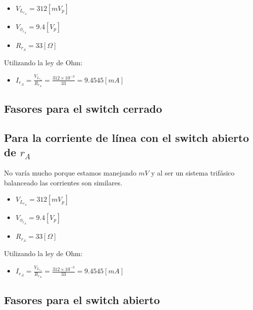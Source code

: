 \documentclass[12pt, letterpaper]{article}
\begin{document}
\begin{itemize}
	\item \(V_{L_{r_A}} = 312 [mV_p]\)
	\item \(V_{\phi_{r_A}} = 9.4 [V_p]\)
	\item \(R_{r_A} = 33 [\Omega]\)
\end{itemize}

Utilizando la ley de Ohm:

\begin{itemize}
	\item \(I_{r_A} = \frac{V_{L_{r_A}}}{R_{r_A}} = \frac{312 \times 10^{-3}}{33} = 9.4545 [mA]\)
\end{itemize}


\subsection*{Fasores para el switch cerrado}


\subsection*{Para la corriente de línea con el switch abierto de \(r_A\)}

No varía mucho porque estamos manejando \(mV\) y al ser un sistema trifásico balanceado las corrientes son similares.

\begin{itemize}
	\item \(V_{L_{r_A}} = 312 [mV_p]\)
	\item \(V_{\phi_{r_A}} = 9.4 [V_p]\)
	\item \(R_{r_A} = 33 [\Omega]\)
\end{itemize}

Utilizando la ley de Ohm:

\begin{itemize}
	\item \(I_{r_A} = \frac{V_{L_{r_A}}}{R_{r_A}} = \frac{312 \times 10^{-3}}{33} = 9.4545 [mA]\)
\end{itemize}

\subsection*{Fasores para el switch abierto}
\end{document}
